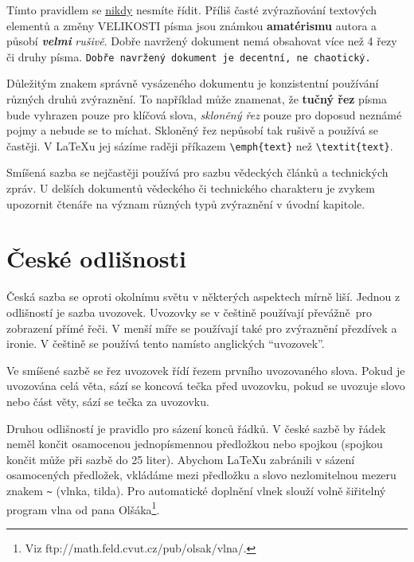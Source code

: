 \documentclass[a4paper,11pt,twocolumn]{article}
\begin{document}
 \vspace{8pt}
Tímto pravidlem se \underline{nikdy} nesmíte řídit. Příliš časté zvýrazňování textových elementů a změny {\fontsize{25}{25}\selectfont V}{\fontsize{21}{21}\selectfont E}{\fontsize{17}{17}\selectfont L}{\fontsize{14}{14}\selectfont I}{\fontsize{12}{12}\selectfont K}{\fontsize{11}{11}\selectfont O}{\fontsize{10}{10}\selectfont S}{\fontsize{9}{9}\selectfont T}{\fontsize{8}{8}\selectfont I} písma {\Large jsou} {\LARGE známkou} {\huge \bfseries amatérismu} autora a působí \textbf{\itshape velmi} \emph{rušivě}. Dobře navržený dokument nemá obsahovat více než 4 řezy či druhy písma.
\texttt{Dobře navržený dokument je decentní, ne chaotický.}
\par
Důležitým znakem správně vysázeného dokumentu je konzistentní používání různých druhů zvýraznění.
To například může znamenat, že \textbf{tučný řez} písma bude vyhrazen pouze pro klíčová slova, \emph{skloněný řez} pouze pro doposud neznámé pojmy a nebude se to míchat.
Skloněný řez nepůsobí tak rušivě a používá se častěji.
V \LaTeX u jej sázíme raději příkazem \verb|\emph{text}| než \verb|\textit{text}|.
\par
Smíšená sazba se nejčastěji používá pro sazbu vědeckých článků a technických zpráv. U delších dokumentů vědeckého či technického charakteru je zvykem upozornit čtenáře na význam různých typů zvýraznění v úvodní kapitole.


\section {České odlišnosti }

\noindent Česká sazba se oproti okolnímu světu v některých aspektech mírně liší. Jednou z odlišností je sazba uvozovek. Uvozovky se v češtině používají převážně~pro zobrazení přímé řeči. V menší míře se používají také pro zvýraznění přezdívek a ironie. V češtině se použí\-vá tento  namísto anglických ``uvozovek''.
\par Ve smíšené sazbě se řez uvozovek řídí řezem první\-ho uvozovaného slova. Pokud je uvozována celá věta, sází se koncová tečka před uvozovku, pokud se uvozuje slovo nebo část věty, sází se tečka za uvozovku.

Druhou odlišností je pravidlo pro sázení konců řádků. V české sazbě by řádek neměl končit osamocenou jednopísmennou předložkou nebo spojkou (spojkou  končit může při sazbě do 25 liter). Abychom \LaTeX u zabránili v sázení osamocených předložek, vkládáme mezi předložku a slovo nezlomitelnou mezeru znakem \verb|~| (vlnka, tilda). Pro automatické doplnění vlnek slouží volně šiřitelný program vlna od pana Olšáka\footnote{Viz ftp://math.feld.cvut.cz/pub/olsak/vlna/.}.
\end{document}
